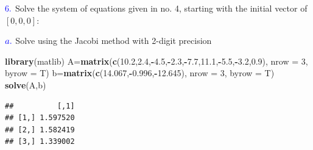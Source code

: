 \documentclass[
]{article}
\newenvironment{Shaded}{\begin{snugshade}}{\end{snugshade}}
\newcommand{\AttributeTok}[1]{\textcolor[rgb]{0.13,0.29,0.53}{#1}}
\newcommand{\DecValTok}[1]{\textcolor[rgb]{0.00,0.00,0.81}{#1}}
\newcommand{\FloatTok}[1]{\textcolor[rgb]{0.00,0.00,0.81}{#1}}
\newcommand{\FunctionTok}[1]{\textcolor[rgb]{0.13,0.29,0.53}{\textbf{#1}}}
\newcommand{\NormalTok}[1]{#1}
\newcommand{\OtherTok}[1]{\textcolor[rgb]{0.56,0.35,0.01}{#1}}
\newcommand{\SpecialCharTok}[1]{\textcolor[rgb]{0.81,0.36,0.00}{\textbf{#1}}}
\begin{document}
\(\textcolor{blue}{6.}\) Solve the system of equations given in no. 4,
starting with the initial vector of \([0,0,0]\):

\(\textcolor{blue}{a.}\) Solve using the Jacobi method with 2-digit
precision

\begin{Shaded}
\begin{Highlighting}[]
\FunctionTok{library}\NormalTok{(matlib)}
\NormalTok{A}\OtherTok{=}\FunctionTok{matrix}\NormalTok{(}\FunctionTok{c}\NormalTok{(}\FloatTok{10.2}\NormalTok{,}\FloatTok{2.4}\NormalTok{,}\SpecialCharTok{{-}}\FloatTok{4.5}\NormalTok{,}\SpecialCharTok{{-}}\FloatTok{2.3}\NormalTok{,}\SpecialCharTok{{-}}\FloatTok{7.7}\NormalTok{,}\FloatTok{11.1}\NormalTok{,}\SpecialCharTok{{-}}\FloatTok{5.5}\NormalTok{,}\SpecialCharTok{{-}}\FloatTok{3.2}\NormalTok{,}\FloatTok{0.9}\NormalTok{), }\AttributeTok{nrow =} \DecValTok{3}\NormalTok{, }\AttributeTok{byrow =}\NormalTok{ T)}
\NormalTok{b}\OtherTok{=}\FunctionTok{matrix}\NormalTok{(}\FunctionTok{c}\NormalTok{(}\FloatTok{14.067}\NormalTok{,}\SpecialCharTok{{-}}\FloatTok{0.996}\NormalTok{,}\SpecialCharTok{{-}}\FloatTok{12.645}\NormalTok{), }\AttributeTok{nrow =} \DecValTok{3}\NormalTok{, }\AttributeTok{byrow =}\NormalTok{ T)}
\FunctionTok{solve}\NormalTok{(A,b)}
\end{Highlighting}
\end{Shaded}

\begin{verbatim}
##          [,1]
## [1,] 1.597520
## [2,] 1.582419
## [3,] 1.339002
\end{verbatim}
\end{document}
